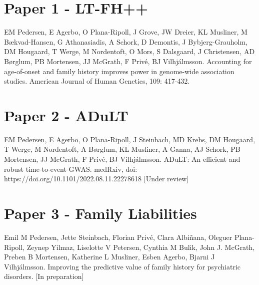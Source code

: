 \documentclass[a4paper, twoside]{report}
\begin{document}
\begin{appendices}
\chapter{Paper 1 - LT-FH++}
\thispagestyle{empty}
EM Pedersen, E Agerbo, O Plana-Ripoll, J Grove, JW Dreier, KL Musliner, M Bækvad-Hansen, G Athanasiadis, A Schork, D Demontis, J Bybjerg-Grauholm, DM Hougaard, T Werge, M Nordentoft, O Mors, S Dalsgaard, J Christensen,  AD Børglum, PB Mortensen, JJ McGrath, F Privé, BJ Vilhjálmsson. Accounting for age-of-onset and family history improves power in genome-wide association studies. American Journal of Human Genetics, 109: 417-432.


%

\chapter{Paper 2 - ADuLT}
\thispagestyle{empty}
EM Pedersen, E Agerbo, O Plana-Ripoll, J Steinbach, MD Krebs, DM Hougaard, T Werge, M Nordentoft, A Børglum,  KL Musliner, A Ganna, AJ Schork, PB Mortensen,  JJ McGrath,  F Privé, BJ Vilhjálmsson. ADuLT: An efficient and robust time-to-event GWAS. medRxiv, doi: https://doi.org/10.1101/2022.08.11.22278618 [Under review]


%

\chapter{Paper 3 - Family Liabilities}
\thispagestyle{empty}
Emil M Pedersen, Jette Steinbach, Florian Privé, Clara Albiñana, Oleguer Plana-Ripoll, Zeynep Yilmaz, Liselotte V Petersen, Cynthia M Bulik, John J. McGrath, Preben B Mortensen, Katherine L Musliner, Esben Agerbo, Bjarni J Vilhjálmsson. Improving the predictive value of family history for psychiatric disorders. [In preparation]

%
%
%
%

\end{appendices}
\end{document}
